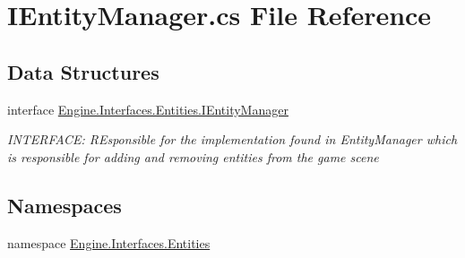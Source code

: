 \hypertarget{a00113}{}\section{I\+Entity\+Manager.\+cs File Reference}
\label{a00113}
\subsection*{Data Structures}
\begin{DoxyCompactItemize}
\item 
interface \hyperlink{a00442}{Engine.\+Interfaces.\+Entities.\+I\+Entity\+Manager}
\begin{DoxyCompactList}\small\item\em I\+N\+T\+E\+R\+F\+A\+CE\+: R\+Esponsible for the implementation found in Entity\+Manager which is responsible for adding and removing entities from the game scene \end{DoxyCompactList}\end{DoxyCompactItemize}
\subsection*{Namespaces}
\begin{DoxyCompactItemize}
\item 
namespace \hyperlink{a00259}{Engine.\+Interfaces.\+Entities}
\end{DoxyCompactItemize}
